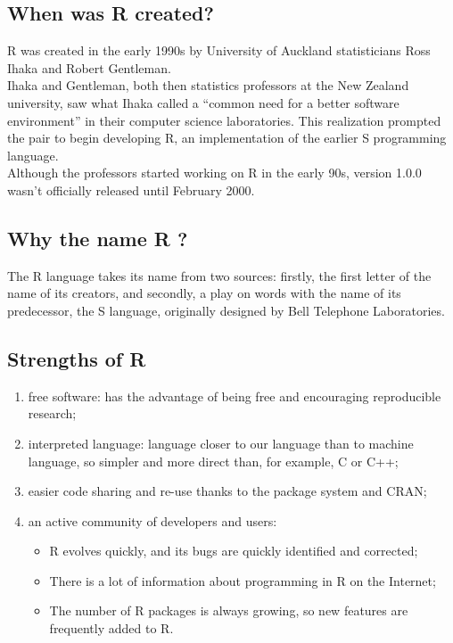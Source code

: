 \documentclass[
]{book}
\providecommand{\tightlist}{%
  \setlength{\itemsep}{0pt}\setlength{\parskip}{0pt}}
\begin{document}
\hypertarget{when-was-r-created}{%
\subsection*{When was R created?}\label{when-was-r-created}}

R was created in the early 1990s by University of Auckland statisticians Ross Ihaka and Robert Gentleman.\\
Ihaka and Gentleman, both then statistics professors at the New Zealand university, saw what Ihaka called a ``common need for a better software environment'' in their computer science laboratories. This realization prompted the pair to begin developing R, an implementation of the earlier S programming language.\\
Although the professors started working on R in the early 90s, version 1.0.0 wasn't officially released until February 2000.

\hypertarget{why-the-name-r}{%
\subsection*{Why the name R ?}\label{why-the-name-r}}

The R language takes its name from two sources: firstly, the first letter of the name of its creators, and secondly, a play on words with the name of its predecessor, the S language, originally designed by Bell Telephone Laboratories.

\hypertarget{strengths-of-r}{%
\subsection*{Strengths of R}\label{strengths-of-r}}

\begin{enumerate}
\def\labelenumi{\arabic{enumi}.}
\item
  free software: has the advantage of being free and encouraging reproducible research;
\item
  interpreted language: language closer to our language than to machine language, so simpler and more direct than, for example, C or C++;
\item
  easier code sharing and re-use thanks to the package system and CRAN;
\item
  an active community of developers and users:

  \begin{itemize}
  \tightlist
  \item
    R evolves quickly, and its bugs are quickly identified and corrected;
  \item
    There is a lot of information about programming in R on the Internet;
  \item
    The number of R packages is always growing, so new features are frequently added to R.
  \end{itemize}
\end{enumerate}
\end{document}
